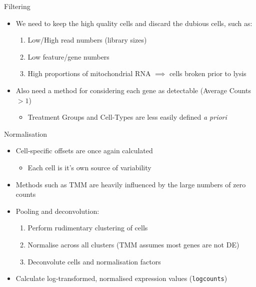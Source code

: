 \documentclass[aspectratio=169,11pt]{beamer}
\begin{document}
\begin{frame}{Filtering}

	\begin{itemize}
		\item We need to keep the high quality cells and discard the dubious cells, such as:\\[2mm]
		\begin{enumerate}
			\item Low/High read numbers (library sizes)
			\item Low feature/gene numbers
			\item High proportions of mitochondrial RNA $\implies$ cells broken prior to lysis\\[2mm]
		\end{enumerate}
		\pause
		\item Also need a method for considering each gene as detectable (Average Counts $>1$)
		\begin{itemize}
			\item Treatment Groups and Cell-Types are less easily defined \textit{a priori}
		\end{itemize}
	\end{itemize}

\end{frame}


\begin{frame}{Normalisation}
	\begin{itemize}
		\item Cell-specific offsets are once again calculated
		\begin{itemize}
			\item Each cell is it's own source of variability
		\end{itemize}
		\item Methods such as TMM are heavily influenced by the large numbers of zero counts
		\item Pooling and deconvolution:
		\begin{enumerate}
			\item Perform rudimentary clustering of cells		
			\item Normalise across all clusters (TMM assumes most genes are not DE)
			\item Deconvolute cells and normalisation factors
		\end{enumerate}
		\item Calculate log-transformed, normalised expression values (\texttt{logcounts})
	\end{itemize}
\end{frame}
\end{document}
